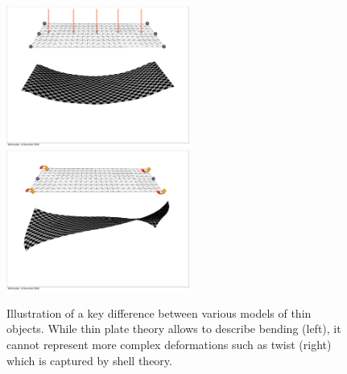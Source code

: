 \documentclass{llncs}
\begin{document}
\begin{figure}[ht]
\begin{center}
\includegraphics[width=6cm]{images/board_bending}
\hfill
\includegraphics[width=6cm]{images/board_twist}
\caption{Illustration of a key difference between various models of thin objects. While thin plate theory allows to describe bending (left), it cannot represent more complex deformations such as twist (right) which is captured by shell theory.}
\label{fig-boards}
\end{center}
\end{figure}
\end{document}
